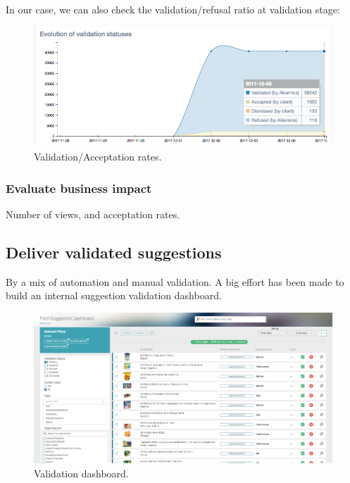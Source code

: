 In our case, we can also check the validation/refusal ratio at validation stage:

\begin{figure}[H]
\centering
\includegraphics[scale=0.50]{./images/monitoring/validation-acceptation-monitoring.png}
\caption{Validation/Acceptation rates.}
\end{figure}

\subsubsection{Evaluate business impact}

Number of views, and acceptation rates.

\subsection{Deliver validated suggestions}

By a mix of automation and manual validation.
A big effort has been made to build an internal suggestion validation dashboard. 

\begin{figure}[H]
\centering
\includegraphics[scale=0.50]{./images/data-quality/validation-dashboard.png}
\caption{Validation dashboard.}
\end{figure}

